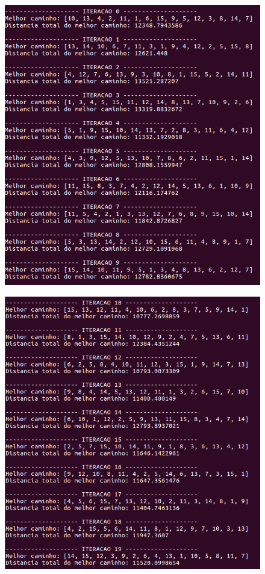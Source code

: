 \documentclass[hidelinks,12pt]{article}
\begin{document}
		\newpage	

		\begin{figure}[!h]
			\centering
			\includegraphics[scale=0.6]{Figures/m15-1-1.png}
		\end{figure}

		\newpage
		
		\begin{figure}[!h]
			\centering
			\includegraphics[scale=0.6]{Figures/m15-1-2.png}
		\end{figure}
\end{document}
